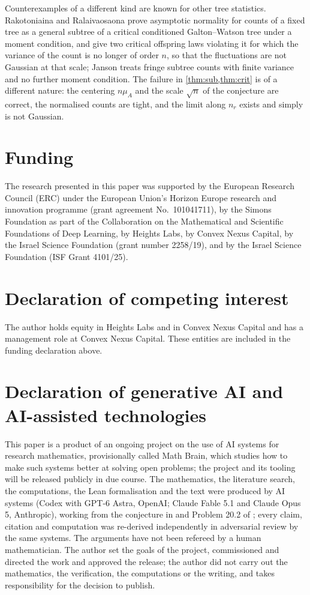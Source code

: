 \documentclass[11pt]{amsart}
\theoremstyle{definition}
\begin{document}
Counterexamples of a different kind are known for other tree statistics. Rakotoniaina and Ralaivaosaona \cite{RR} prove asymptotic normality for counts of a fixed tree as a general subtree of a critical conditioned Galton--Watson tree under a moment condition, and give two critical offspring laws violating it for which the variance of the count is no longer of order $n$, so that the fluctuations are not Gaussian at that scale; Janson \cite{Janson21} treats fringe subtree counts with finite variance and no further moment condition. The failure in \cref{thm:sub,thm:crit} is of a different nature: the centering $n\mu_A$ and the scale $\sqrt n$ of the conjecture are correct, the normalised counts are tight, and the limit along $n_r$ exists and simply is not Gaussian.

\section*{Funding}
The research presented in this paper was supported by the European Research Council (ERC) under the European Union's Horizon Europe research and innovation programme (grant agreement No.~101041711), by the Simons Foundation as part of the Collaboration on the Mathematical and Scientific Foundations of Deep Learning, by Heights Labs, by Convex Nexus Capital, by the Israel Science Foundation (grant number 2258/19), and by the Israel Science Foundation (ISF Grant 4101/25).

\section*{Declaration of competing interest}
The author holds equity in Heights Labs and in Convex Nexus Capital and has a management role at Convex Nexus Capital. These entities are included in the funding declaration above.

\section*{Declaration of generative AI and AI-assisted technologies}
This paper is a product of an ongoing project on the use of AI systems for research mathematics, provisionally called Math Brain, which studies how to make such systems better at solving open problems; the project and its tooling will be released publicly in due course. The mathematics, the literature search, the computations, the Lean formalisation and the text were produced by AI systems (Codex with GPT-6 Astra, OpenAI; Claude Fable 5.1 and Claude Opus 5, Anthropic), working from the conjecture in \cite{Thevenin} and Problem 20.2 of \cite{Janson12}; every claim, citation and computation was re-derived independently in adversarial review by the same systems. The arguments have not been refereed by a human mathematician. The author set the goals of the project, commissioned and directed the work and approved the release; the author did not carry out the mathematics, the verification, the computations or the writing, and takes responsibility for the decision to publish.
\end{document}
